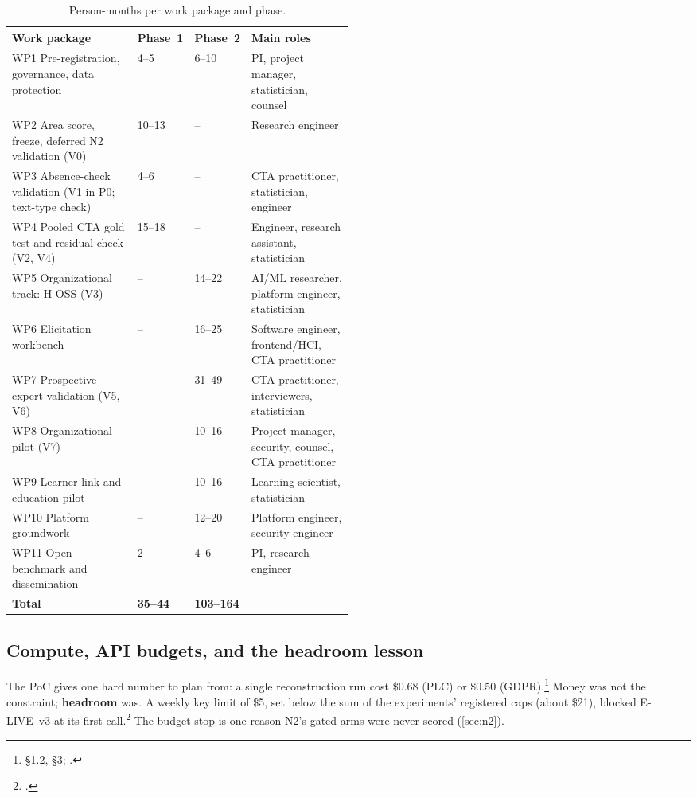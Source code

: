 \begin{table}[htbp]
  \centering
  \footnotesize
  \caption{Person-months per work package and phase.}
  \label{tab:resources-pm}
  \begin{tabularx}{\linewidth}{@{}Xp{0.1\linewidth}p{0.1\linewidth}p{0.3\linewidth}@{}}
    \toprule
    Work package & Phase~1 & Phase~2 & Main roles \\
    \midrule
    WP1 Pre-registration, governance, data protection & 4--5 & 6--10 &
      PI, project manager, statistician, counsel \\
    WP2 Area score, freeze, deferred N2 validation (V0) & 10--13 & -- &
      Research engineer \\
    WP3 Absence-check validation (V1 in P0; text-type check) & 4--6 & -- &
      CTA practitioner, statistician, engineer \\
    WP4 Pooled CTA gold test and residual check (V2, V4) & 15--18 & -- &
      Engineer, research assistant, statistician \\
    WP5 Organizational track: H-OSS (V3) & -- & 14--22 &
      AI/ML researcher, platform engineer, statistician \\
    WP6 Elicitation workbench & -- & 16--25 &
      Software engineer, frontend/HCI, CTA practitioner \\
    WP7 Prospective expert validation (V5, V6) & -- & 31--49 &
      CTA practitioner, interviewers, statistician \\
    WP8 Organizational pilot (V7) & -- & 10--16 &
      Project manager, security, counsel, CTA practitioner \\
    WP9 Learner link and education pilot & -- & 10--16 &
      Learning scientist, statistician \\
    WP10 Platform groundwork & -- & 12--20 &
      Platform engineer, security engineer \\
    WP11 Open benchmark and dissemination & 2 & 4--6 &
      PI, research engineer \\
    \midrule
    \textbf{Total} & \textbf{35--44} & \textbf{103--164} & \\
    \bottomrule
  \end{tabularx}
\end{table}

\subsection{Compute, API budgets, and the headroom lesson}

\evobs{} The PoC gives one hard number to plan from: a single reconstruction run cost \$0.68 (PLC)
or \$0.50 (GDPR).\footnote{ \S1.2, \S3;
.} Money was not the constraint; \textbf{headroom} was. A weekly key
limit of \$5, set below the sum of the experiments' registered caps (about \$21), blocked E-LIVE~v3 at its first
call.\footnote{.} The budget stop is one reason N2's gated arms were never
scored (\cref{sec:n2}).

